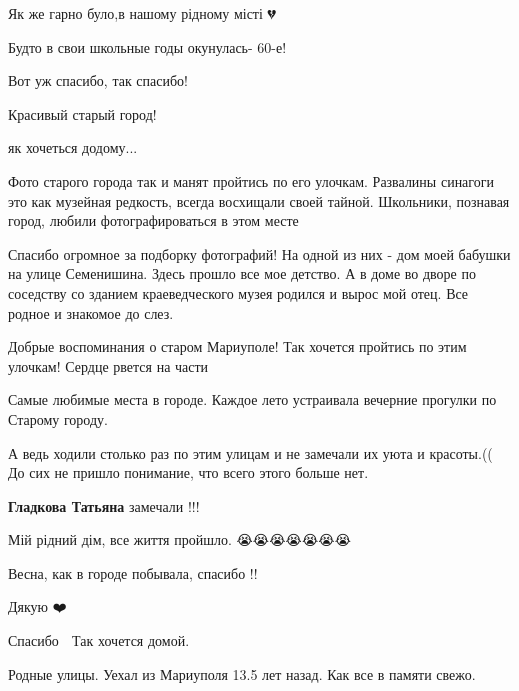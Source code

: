  
 
 
 
 

\qqSecCmt


Як же гарно було,в нашому рідному місті 💔


Будто в свои школьные годы окунулась- 60-е!

Вот уж спасибо, так спасибо!


Красивый старый город!


як хочеться додому...


Фото старого города так и манят пройтись по его улочкам. Развалины синагоги это
как музейная редкость, всегда восхищали своей тайной. Школьники, познавая
город, любили фотографироваться в этом месте


Спасибо огромное за подборку фотографий! На одной из них - дом моей бабушки на
улице Семенишина. Здесь прошло все мое детство. А в доме во дворе по соседству
со зданием краеведческого музея родился и вырос мой отец. Все родное и знакомое
до слез.


Добрые воспоминания о старом Мариуполе! Так хочется пройтись по этим улочкам! Сердце рвется на части


Самые любимые места в городе. Каждое лето устраивала вечерние прогулки по Старому городу.


А ведь ходили столько раз по этим улицам и не замечали их уюта и красоты.(( До
сих не пришло понимание, что всего этого больше нет.

\begin{itemize} %
\textbf{Гладкова Татьяна} замечали !!!
\end{itemize} %


Мій рідний дім, все життя пройшло. 😭😭😭😭😭😭😭


Весна, как в городе побывала, спасибо !!


Дякую ❤️


Спасибо 🙏 Так хочется домой.


Родные улицы. Уехал из Мариуполя 13.5 лет назад. Как все в памяти свежо.
